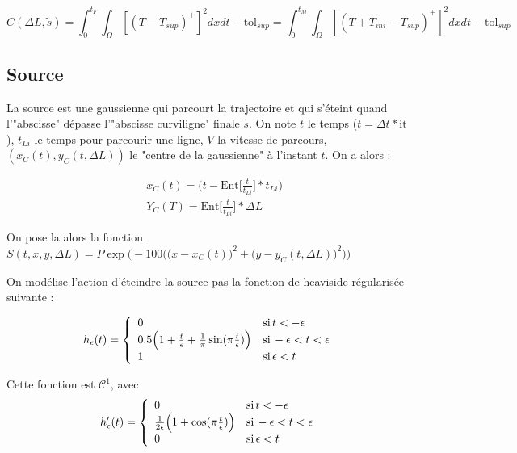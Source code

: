 \documentclass[11pt,a4paper]{article}
\begin{document}
\begin{equation}
\label{eq:contrainte}
C(\Delta L,\tilde{s})=\int_{0}^{t_F}\int_{\Omega}[(T-T_{sup})^+]^2dxdt-\textrm{tol}_{sup}=\int_{0}^{t_M}\int_{\Omega}[(\tilde{T}+T_{ini}-T_{sup})^+]^2dxdt-\textrm{tol}_{sup}
\end{equation} 

\subsection*{Source}
La source est une gaussienne qui parcourt la trajectoire et qui s'éteint quand l'"abscisse" dépasse l'"abscisse curviligne" finale $\tilde{s}$. On note $t$ le temps ($t=\Delta t*\textrm{it}$), $t_{Li}$ le temps pour parcourir une ligne, $V$ la vitesse de parcours, $(x_C(t),y_C(t,\Delta L))$ le "centre de la gaussienne" à l'instant $t$. On a alors :

\begin{equation}
\begin{aligned}
&x_C(t)=\Big(t-\textrm{Ent}\Big[\frac{t}{t_{Li}}\Big]*t_{Li}\Big) \\
&Y_C(T)=\textrm{Ent}\Big[\frac{t}{t_{Li}}\Big]*\Delta L
\end{aligned}
\end{equation}

On pose la alors la fonction $S(t,x,y,\Delta L)=P\exp\bigg(-100\Big(\big(x-x_C(t)\big)^2+\big(y-y_C(t,\Delta L)\big)^2\Big)\bigg)$
  
  On modélise l'action d'éteindre la source pas la fonction de heaviside régularisée suivante :

\begin{equation*}
h_{\epsilon}(t)=\left\{
\begin{array}{ll}
0 & \textrm{si\,} t < -\epsilon \\
0.5\Big(1+\frac{t}{\epsilon}+\frac{1}{\pi} \sin(\pi \frac{t}{\epsilon})\Big) & \textrm{si\,}-\epsilon < t<\epsilon \\
1 & \textrm{si\,}  \epsilon<t \\
\end{array}
\right.
\end{equation*}

Cette fonction est $\mathcal{C}^1$, avec 
\begin{equation*}
h'_{\epsilon}(t)=\left\{
\begin{array}{ll}
0 & \textrm{si\,} t < -\epsilon \\
\frac{1}{2\epsilon}\Big(1+\cos(\pi \frac{t}{\epsilon})\Big) & \textrm{si\,}-\epsilon < t<\epsilon \\
0& \textrm{si\,}  \epsilon<t \\
\end{array}
\right.
\end{equation*}
\end{document}
